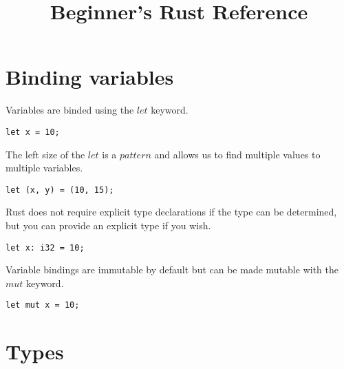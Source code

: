 \documentclass[letterpaper,landscape]{article}
\title{Beginner's Rust Reference}
\begin{document}
\begin{multicols}{3}							%
\raggedcolumns							%

\section*{Binding variables}

Variables are binded using the $let$ keyword.

\begin{verbatim}
let x = 10;
\end{verbatim}

The left size of the $let$ is a $pattern$ and allows us to find multiple values to multiple variables.

\begin{verbatim}
let (x, y) = (10, 15);
\end{verbatim}

Rust does not require explicit type declarations if the type can be determined, but you can provide an explicit type if you wish.

\begin{verbatim}
let x: i32 = 10;
\end{verbatim}

Variable bindings are immutable by default but can be made mutable with the $mut$ keyword.

\begin{verbatim}
let mut x = 10;
\end{verbatim}

\section*{Types}


\end{multicols}
\end{document}
